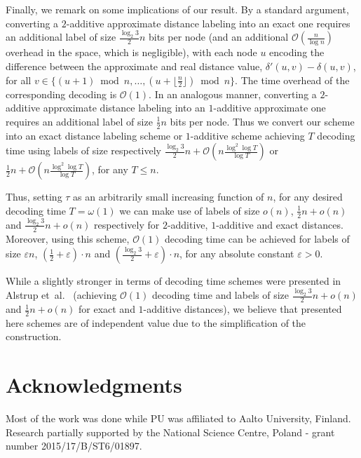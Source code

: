 \documentclass{article}[11pt,letter]
\newcommand{\bigo}{\mathcal{O}}
\newcommand{\etal}{{et~al.}\xspace}
\newcommand{\cost}{\delta}
\newcommand{\da}{\delta'}
\begin{document}
Finally, we remark on some implications of our result. By a standard argument, converting a $2$-additive approximate distance labeling into an exact one requires an additional label of size $\frac{\log_2 3}{2} n$ bits per node (and an additional $\bigo(\frac{n}{\log n})$ overhead in the space, which is negligible), with each node $u$ encoding the difference between the approximate and real distance value, $\da(u,v)-\cost(u,v)$, for all $v \in \{(u+1) \bmod n, \ldots, (u + \lfloor \frac n 2 \rfloor) \bmod n\}$. The time overhead of the corresponding decoding is $\bigo(1)$. In an analogous manner, converting a $2$-additive approximate distance labeling into an $1$-additive approximate one requires an additional label of size $\frac{1}{2}n$ bits per node. Thus we convert our scheme into an exact distance labeling scheme or $1$-additive scheme achieving $T$ decoding time using labels of size respectively $ \frac{\log_2 3}{2} n + \bigo(n \frac{\log^2 \log T}{\log T})$ or $\frac{1}{2} n + \bigo(n \frac{\log^2 \log T}{\log T})$, for any $T \le n$.


Thus, setting $\tau$ as an arbitrarily small increasing function of $n$, for any desired decoding time $T=\omega(1)$ we can make use of labels of size $o(n)$, $\frac12n + o(n)$ and $\frac{\log_2 3}{2} n + o(n)$ respectively for $2$-additive, $1$-additive and exact distances. Moreover, using this scheme, $\bigo(1)$ decoding time can be achieved for labels of size $\varepsilon  n$, $(\frac{1}{2} + \varepsilon) \cdot n$ and $(\frac{\log_2 3}{2} + \varepsilon) \cdot n$, for any absolute constant $\varepsilon > 0$.

While a slightly stronger in terms of decoding time schemes were presented in  Alstrup \etal~\cite{DBLP:conf/soda/AlstrupGHP16} (achieving $\bigo(1)$ decoding time and labels of size $\frac{\log_2 3}{2} n + o(n)$ and $\frac12n + o(n)$ for exact and $1$-additive distances), we believe that presented here schemes are of independent value due to the simplification of the construction.







\section*{Acknowledgments}
Most of the work was done while PU was affiliated to Aalto University, Finland.
Research partially supported by the National Science Centre, Poland - grant number 2015/17/B/ST6/01897.



\end{document}
